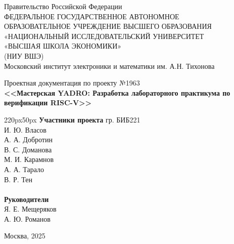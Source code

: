 \begin{center}
    Правительство Российской Федерации \\
ФЕДЕРАЛЬНОЕ ГОСУДАРСТВЕННОЕ АВТОНОМНОЕ \\
ОБРАЗОВАТЕЛЬНОЕ УЧРЕЖДЕНИЕ ВЫСШЕГО ОБРАЗОВАНИЯ \\
«НАЦИОНАЛЬНЫЙ ИССЛЕДОВАТЕЛЬСКИЙ УНИВЕРСИТЕТ \\
«ВЫСШАЯ ШКОЛА ЭКОНОМИКИ» \\
(НИУ ВШЭ) \vspace{24px}\\
Московский институт электроники и математики им. А.Н. Тихонова\\
\vspace*{\fill}
\end{center}
\begingroup
\centering
Проектная документация по проекту №1963\\
\textbf{<<Мастерская YADRO: Разработка лабораторного практикума по верификации RISC-V>>}\\
\endgroup
\vspace{48px}
\begin{adjustwidth}{220px}{50px}
    \textbf{Участники проекта} гр. БИБ221 \\
    И. Ю. Власов\\
    А. А. Добротин\\
    В. С. Доманова\\
    М. И. Карамнов\\
    А. А. Тарало\\
    В. Р. Тен\\

    \vspace{32px}\\
    \textbf{Руководители}\\
    Я. Е. Мещеряков\\
    А. Ю. Романов\\  

\end{adjustwidth}
\vspace*{\fill}
\begin{center}
    Москва, 2025
\end{center}
\clearpage